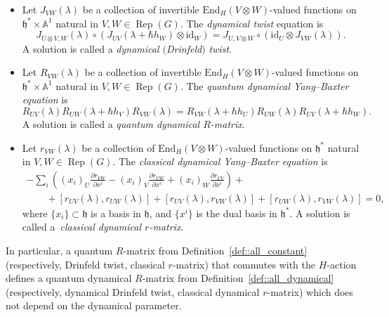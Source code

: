 \documentclass[11pt]{article}
\numberwithin{equation}{section}
\newcommand{\h}{\mathfrak{h}}
\newcommand{\End}{\mathrm{End}}
\newcommand{\id}{\mathrm{id}}
\DeclareMathOperator{\Rep}{Rep}
\begin{document}
	\begin{Definition}\qquad
		\label{def::all_dynamical}
		\begin{itemize}\itemsep=0pt
			\item Let $J_{VW}(\lambda)$ be a collection of invertible $\End_{H}(V \otimes W)$-valued functions on $\h^*\times \mathbb{A}^1$ natural in $V,W\in \Rep(G)$. The \emph{dynamical twist} equation is
			\begin{equation}
				\label{eq::dyn_twist}
				J_{U \otimes V,W}(\lambda) \circ (J_{UV}(\lambda+\hbar h_W) \otimes \id_W) = J_{U,V\otimes W} \circ (\id_U \otimes J_{VW}(\lambda)).
			\end{equation}
			A solution is called a \emph{dynamical $($Drinfeld$)$ twist}.
			\item Let $R_{VW}(\lambda)$ be a collection of invertible $\End_{H}(V \otimes W)$-valued functions on $\h^*\times \mathbb{A}^1$ natural in $V,W\in \Rep(G)$. The \emph{quantum dynamical Yang--Baxter equation} is
			\begin{equation}
				\label{eq::qdybe}
				R_{UV}(\lambda) R_{UW} (\lambda + \hbar h_V) R_{VW}(\lambda) = R_{VW}(\lambda+\hbar h_U) R_{UW}(\lambda) R_{UV}(\lambda + \hbar h_W).
			\end{equation}
			A solution is called a \emph{quantum dynamical $R$-matrix}.
			\item Let $r_{VW}(\lambda)$ be a collection of $\End_{H}(V \otimes W)$-valued functions on $\h^*$ natural in $V,W\in \Rep(G)$. The \emph{classical dynamical Yang--Baxter equation} is
			\begin{gather}
					-\sum\limits_i \left( (x_i)_{U} \frac{\partial r_{VW}}{\partial x^i} - (x_i)_V \frac{\partial r_{UW}}{\partial x^i} + (x_i)_W \frac{\partial r_{UV}}{\partial x^i}\right) +\nonumber \\
					\qquad{}+[r_{UV}(\lambda),r_{UW}(\lambda)] + [r_{UV}(\lambda),r_{VW}(\lambda)] + [r_{UW}(\lambda), r_{VW}(\lambda)] = 0,\label{eq::cdybe}
			\end{gather}
			where $\{x_i\} \subset \h$ is a basis in $\h$, and $\bigl\{x^i\bigr\}$ is the dual basis in $\h^*$. A solution is called a~\emph{classical dynamical $r$-matrix}.
		\end{itemize}
	\end{Definition}
	
	\begin{Remark}
		In particular, a quantum $R$-matrix from Definition~\ref{def::all_constant} (respectively, Drinfeld twist, classical $r$-matrix) that commutes with the $H$-action defines a quantum dynamical $R$-matrix from Definition~\ref{def::all_dynamical} (respectively, dynamical Drinfeld twist, classical dynamical $r$-matrix) which does not depend on the dynamical parameter.
	\end{Remark}
	
\end{document}
